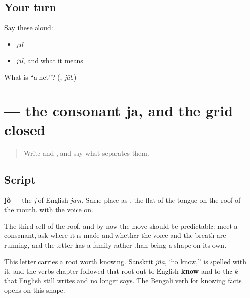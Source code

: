 \subsection*{Your turn}
Say these aloud:

\begin{itemize}
\raggedright
  \item \emph{jāl}
  \item \emph{jāl}, and what it means
\end{itemize}

\begin{tcolorbox}[breakable,colback=teal!4,colframe=teal!35!black,title={Before you move on}]
What is \textquotedblleft{}a net\textquotedblright{}? (\textbf{}, \emph{jāl}.)
\end{tcolorbox}
\section[\texorpdfstring{\bn{জ} (jô)}{জ (jô)}]{ — the consonant ja, and the grid closed}

\label{lesson:BN-W04-ja}



\begin{quote}
Write \textbf{} and \textbf{}, and say what separates them.
\end{quote}

\subsection*{Script}

\begin{quote}
\end{quote}

\textbf{jô} — the \emph{j} of English \emph{jam}. Same place as \textbf{}, the flat of the tongue on the roof of the mouth, with the voice on.

The third cell of the roof, and by now the move should be predictable: meet a consonant, ask where it is made and whether the voice and the breath are running, and the letter has a family rather than being a shape on its own.

This letter carries a root worth knowing. Sanskrit \emph{jñā}, \textquotedblleft{}to know,\textquotedblright{} is spelled with it, and the verbs chapter followed that root out to English \textbf{know} and to the \emph{k} that English still writes and no longer says. The Bengali verb for knowing facts opens on this shape.

